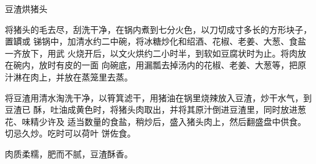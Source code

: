 \begin{recipe}{豆渣烘猪头}

\ingredients


\preparation

将猪头的毛去尽，刮洗干净，在锅内煮到七分火色，以刀切成寸多长的方形块子，置罆或
锑锅中，加清水约二中碗，将冰糖炒化和绍酒、花椒、老姜、大葱、食盐一齐放下，用武
火烧开后，以文火烘约二小时半，到软如豆腐状时为止。将肉放在碗内，放时有皮的一面
向碗底，用漏瓢去掉汤内的花椒、老姜、大葱等，把原汁淋在肉上，并放在蒸笼里去蒸。

将豆渣用清水淘洗干净，以筲箕滤干，用猪油在锅里烧辣放入豆渣，炒干水气，到豆渣已
酥，吐油成黄色时，将猪头肉取出，并将其原汁倒进豆渣里，同时放进葱花、味精少许及
适当数量的食盐，稍炒后，盛入猪头肉上，然后翻盛盘中供食。切忌久炒。吃时可以荷叶
饼佐食。

\features

肉质柔糯，肥而不腻，豆渣酥香。

\end{recipe}

